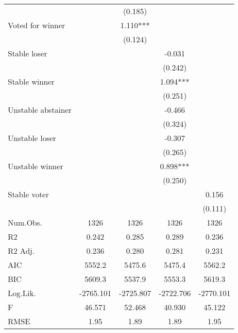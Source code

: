 \begin{longtable}{lcccc}
 & & (0.185) & & \\
Voted for winner & & 1.110*** & & \\
 & & (0.124) & & \\
Stable loser & & & -0.031 & \\
 & & & (0.242) & \\
Stable winner & & & 1.094*** & \\
 & & & (0.251) & \\
Unstable abstainer & & & -0.466 & \\
 & & & (0.324) & \\
Unstable loser & & & -0.307 & \\
 & & & (0.265) & \\
Unstable winner & & & 0.898*** & \\
 & & & (0.250) & \\
Stable voter & & & & 0.156 \\
 & & & & (0.111) \\
\midrule
Num.Obs. & 1326 & 1326 & 1326 & 1326 \\
R2 & 0.242 & 0.285 & 0.289 & 0.236 \\
R2 Adj. & 0.236 & 0.280 & 0.281 & 0.231 \\
AIC & 5552.2 & 5475.6 & 5475.4 & 5562.2 \\
BIC & 5609.3 & 5537.9 & 5553.3 & 5619.3 \\
Log.Lik. & -2765.101 & -2725.807 & -2722.706 & -2770.101 \\
F & 46.571 & 52.468 & 40.930 & 45.122 \\
RMSE & 1.95 & 1.89 & 1.89 & 1.95 \\
\end{longtable}